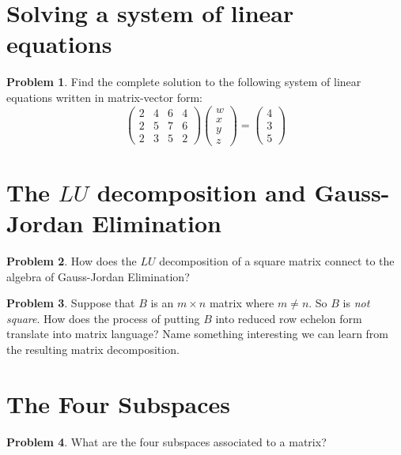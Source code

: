 \documentclass[11pt]{amsart}
\theoremstyle{definition}
\newtheorem{problem}{Problem}[section]
\begin{document}
\vspace{1cm}
\section{Solving a system of linear equations}

\begin{problem}
Find the complete solution to the following system of linear equations written in matrix-vector form:
\[
\begin{pmatrix} 2 & 4 & 6 & 4\\ 2 & 5 & 7 & 6 \\ 2 & 3 & 5 & 2 \end{pmatrix}
\begin{pmatrix} w \\ x \\ y \\ z \end{pmatrix}
= \begin{pmatrix} 4 \\ 3 \\ 5 \end{pmatrix}
\]
\end{problem}

\pagebreak



\section{The $LU$ decomposition and Gauss-Jordan Elimination}

\begin{problem}
How does the $LU$ decomposition of a square matrix connect to the algebra of Gauss-Jordan Elimination?
\end{problem}

\begin{problem}
Suppose that $B$ is an $m\times n$ matrix where $m \neq n$. So $B$ is \emph{not square}. How does the process of putting $B$ into reduced row echelon form translate into matrix language? Name something interesting we can learn from the resulting matrix decomposition.
\end{problem}

\vspace{1cm}
\section{The Four Subspaces}

\begin{problem}
What are the four subspaces associated to a matrix?
\end{problem}
\end{document}
